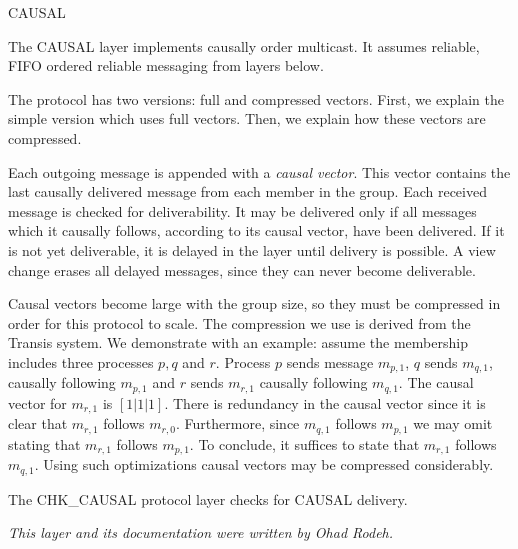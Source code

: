 \begin{Layer}{CAUSAL}

The CAUSAL layer implements causally order multicast.  It assumes
reliable, FIFO ordered reliable messaging from layers below.

\begin{Protocol}
The protocol has two versions: full and compressed vectors.  First,
we explain the simple version which uses full vectors. Then, we
explain how these vectors are compressed.

Each outgoing message is appended with a \emph{causal vector}. This
vector contains the last causally delivered message from each member
in the group.  Each received message is checked for deliverability.
It may be delivered only if all messages which it causally follows,
according to its causal vector, have been delivered.  If it is not
yet deliverable, it is delayed in the layer until delivery is
possible.  A view change erases all delayed messages, since they can
never become deliverable.

Causal vectors become large with the group size, so they must be
compressed in order for this protocol to scale.  The compression we
use is derived from the Transis system.  We demonstrate with an
example: assume the membership includes three processes $p,q$ and
$r$. Process $p$ sends message $m_{p,1}$, $q$ sends $m_{q,1}$,
causally following $m_{p,1}$ and $r$ sends $m_{r,1}$ causally
following $m_{q,1}$. The causal vector for $m_{r,1}$ is
$[1|1|1]$. There is redundancy in the causal vector since it is clear
that $m_{r,1}$ follows $m_{r,0}$. Furthermore, since $m_{q,1}$
follows $m_{p,1}$ we may omit stating that $m_{r,1}$ follows
$m_{p,1}$. To conclude, it suffices to state that $m_{r,1}$ follows
$m_{q,1}$.  Using such optimizations causal vectors may be compressed
considerably.
\end{Protocol}

\begin{Sources}
\end{Sources}

\begin{Testing}
\item
The CHK\_CAUSAL protocol layer checks for CAUSAL delivery.
\end{Testing}

\emph{This layer and its documentation were written by Ohad Rodeh.}
\end{Layer}
